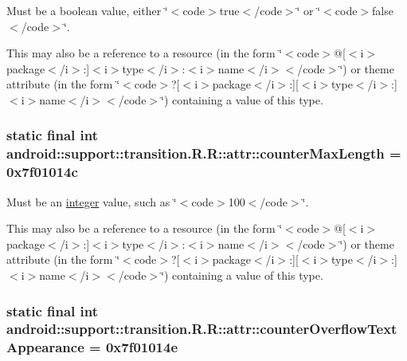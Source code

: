 Must be a boolean value, either \char`\"{}$<$code$>$true$<$/code$>$\char`\"{} or \char`\"{}$<$code$>$false$<$/code$>$\char`\"{}. 

This may also be a reference to a resource (in the form \char`\"{}$<$code$>$@\mbox{[}$<$i$>$package$<$/i$>$:\mbox{]}$<$i$>$type$<$/i$>$:$<$i$>$name$<$/i$>$$<$/code$>$\char`\"{}) or theme attribute (in the form \char`\"{}$<$code$>$?\mbox{[}$<$i$>$package$<$/i$>$:\mbox{]}\mbox{[}$<$i$>$type$<$/i$>$:\mbox{]}$<$i$>$name$<$/i$>$$<$/code$>$\char`\"{}) containing a value of this type. \hypertarget{classandroid_1_1support_1_1transition_1_1_r_1_1attr_c0ed172306482f8f040cd06327c06435}{
\subsubsection[{counterMaxLength}]{\setlength{\rightskip}{0pt plus 5cm}static final int android::support::transition.R.R::attr::counterMaxLength = 0x7f01014c}}
\label{classandroid_1_1support_1_1transition_1_1_r_1_1attr_c0ed172306482f8f040cd06327c06435}


Must be an \hyperlink{classandroid_1_1support_1_1transition_1_1_r_1_1integer}{integer} value, such as \char`\"{}$<$code$>$100$<$/code$>$\char`\"{}. 

This may also be a reference to a resource (in the form \char`\"{}$<$code$>$@\mbox{[}$<$i$>$package$<$/i$>$:\mbox{]}$<$i$>$type$<$/i$>$:$<$i$>$name$<$/i$>$$<$/code$>$\char`\"{}) or theme attribute (in the form \char`\"{}$<$code$>$?\mbox{[}$<$i$>$package$<$/i$>$:\mbox{]}\mbox{[}$<$i$>$type$<$/i$>$:\mbox{]}$<$i$>$name$<$/i$>$$<$/code$>$\char`\"{}) containing a value of this type. \hypertarget{classandroid_1_1support_1_1transition_1_1_r_1_1attr_ad9a33df56ce0d0b672435ab041713eb}{
\subsubsection[{counterOverflowTextAppearance}]{\setlength{\rightskip}{0pt plus 5cm}static final int android::support::transition.R.R::attr::counterOverflowTextAppearance = 0x7f01014e}}
\label{classandroid_1_1support_1_1transition_1_1_r_1_1attr_ad9a33df56ce0d0b672435ab041713eb}



